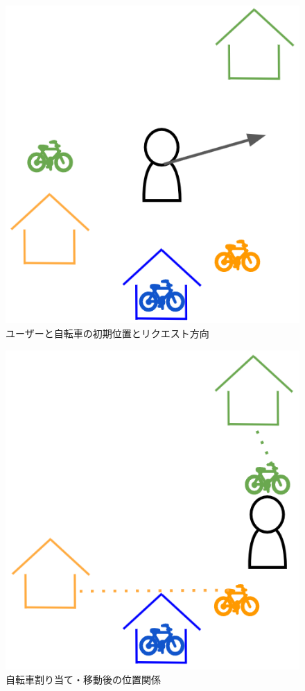       \begin{figure}[htbp]
        \centering
        \includegraphics[scale=0.6]
        {figures/subjectFunction1-0.png}
        \caption{ユーザーと自転車の初期位置とリクエスト方向}
        \label{fig:ユーザーと自転車の初期位置とリクエスト方向}
      \end{figure}
      \begin{figure}[htbp]
        \centering
        \includegraphics[scale=0.6]
        {figures/subjectFunction1-1.png}
        \caption{自転車割り当て・移動後の位置関係}
        \label{fig:自転車割り当て・移動後の位置関係}
      \end{figure}
      

